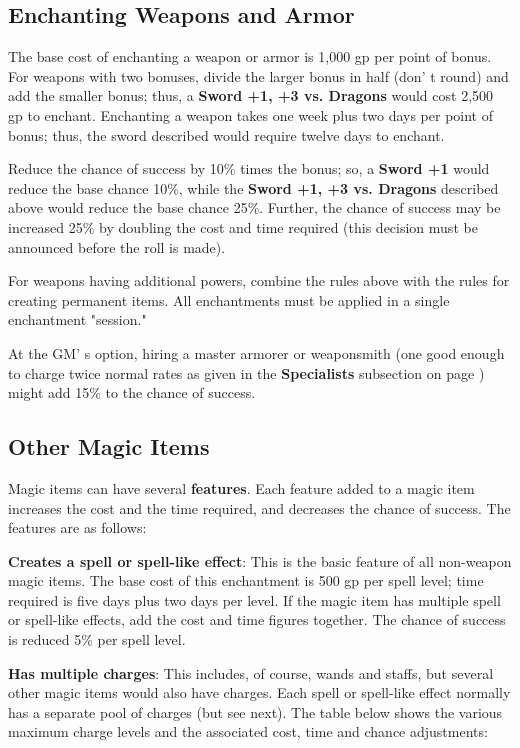\documentclass[a4paper,twoside,openany,10pt]{book}
\begin{document}
\begin{multicols}{2}
\subsection{Enchanting Weapons and Armor}\label{enchanting-weapons-and-armor}

The base cost of enchanting a weapon or armor is 1,000 gp per point of bonus. For weapons with two bonuses, divide the larger bonus in half (don' t round) and add the smaller bonus; thus, a \textbf{Sword +1, +3 vs. Dragons} would cost 2,500 gp to enchant. Enchanting a weapon takes one week plus two days per point of bonus; thus, the sword described would require twelve days to enchant. 

Reduce the chance of success by 10\% times the bonus; so, a \textbf{Sword +1} would reduce the base chance 10\%, while the \textbf{Sword +1, +3 vs. Dragons} described above would reduce the base chance 25\%. Further, the chance of success may be increased 25\% by doubling the cost and time required (this decision must be announced before the roll is made).

For weapons having additional powers, combine the rules above with the rules for creating permanent items. All enchantments must be applied in a single enchantment "session."

At the GM' s option, hiring a master armorer or weaponsmith (one good enough to charge twice normal rates as given in the \textbf{Specialists }subsection on page \hyperlink{Weaponsmithux20Entry}{\pageref{Weaponsmithux20Entry}}) might add 15\% to the chance of success.

\subsection{Other Magic Items}\label{other-magic-items}

Magic items can have several \textbf{features}. Each feature added to a magic item increases the cost and the time required, and decreases the chance of success. The features are as follows:

\textbf{Creates a spell or spell-like effect}: This is the basic feature of all non-weapon magic items. The base cost of this enchantment is 500 gp per spell level; time required is five days plus two days per level. If the magic item has multiple spell or spell-like effects, add the cost and time figures together. The chance of success is reduced 5\% per spell level.

\textbf{Has multiple charges}: This includes, of course, wands and staffs, but several other magic items would also have charges. Each spell or spell-like effect normally has a separate pool of charges (but see next). The table below shows the various maximum charge levels and the associated cost, time and chance adjustments:\medskip


\end{multicols}
\end{document}
